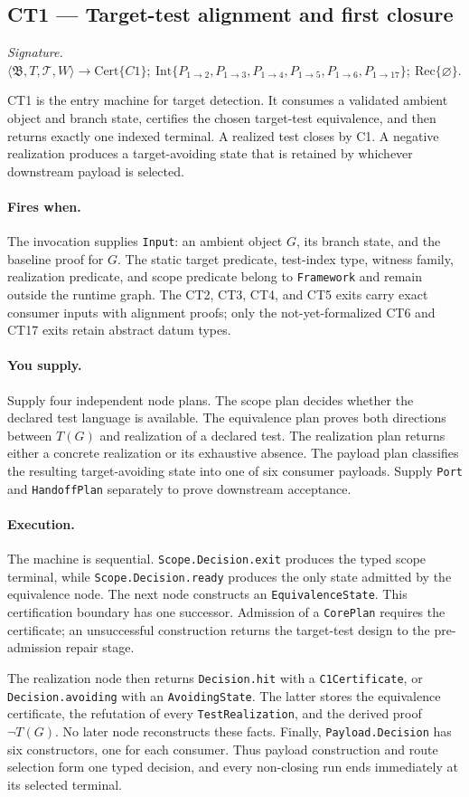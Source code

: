 \documentclass[
  11pt,
]{article}
\theoremstyle{definition}
\newcommand{\ctsignature}[1]{\par\noindent\emph{Signature.}\ #1\par\medskip}
\newcommand{\ctcert}[1]{\mathrm{Cert}\{#1\}}
\newcommand{\ctint}[1]{\mathrm{Int}\{#1\}}
\newcommand{\ctrec}[1]{\mathrm{Rec}\{#1\}}
\newcommand{\ctnone}{\varnothing}
\newcommand{\ctpar}[1]{\paragraph{#1.}}
\begin{document}
\subsection{CT1 --- Target-test alignment and first closure}\label{ct:1}\label{target-predicate-and-local-tests}
\ctsignature{\(\langle\mathfrak B,T,\mathcal T,W\rangle \to
\ctcert{C1};\allowbreak\ \ctint{P_{1\to2},\allowbreak P_{1\to3},\allowbreak P_{1\to4},\allowbreak P_{1\to5},\allowbreak P_{1\to6},\allowbreak P_{1\to17}};\allowbreak\ \ctrec{\ctnone}\).}

CT1 is the entry machine for target detection.  It consumes a validated
ambient object and branch state, certifies the chosen target-test
equivalence, and then returns exactly one indexed terminal.  A realized
test closes by C1.  A negative realization produces a target-avoiding state
that is retained by whichever downstream payload is selected.

\ctpar{Fires when}
The invocation supplies \texttt{Input}: an ambient object \(G\), its branch
state, and the baseline proof for \(G\).  The static target predicate,
test-index type, witness family, realization predicate, and scope predicate
belong to \texttt{Framework} and remain outside the runtime graph.  The CT2,
CT3, CT4, and CT5 exits carry exact consumer inputs with alignment proofs;
only the not-yet-formalized CT6 and CT17 exits retain abstract datum types.

\ctpar{You supply}
Supply four independent node plans.  The scope plan decides whether the
declared test language is available.  The equivalence plan proves both
directions between \(T(G)\) and realization of a declared test.  The
realization plan returns either a concrete realization or its exhaustive
absence.  The payload plan classifies the resulting target-avoiding state
into one of six consumer payloads.  Supply \texttt{Port} and
\texttt{HandoffPlan} separately to prove downstream acceptance.

\ctpar{Execution}
The machine is sequential.  \texttt{Scope.Decision.exit} produces the
typed scope terminal, while \texttt{Scope.Decision.ready} produces the
only state admitted by the equivalence node.  The next node constructs an
\texttt{EquivalenceState}.  This certification boundary has one successor.
Admission of a \texttt{CorePlan} requires the certificate; an unsuccessful
construction returns the target-test design to the pre-admission repair
stage.

The realization node then returns \texttt{Decision.hit} with a
\texttt{C1Certificate}, or \texttt{Decision.avoiding} with an
\texttt{AvoidingState}.  The latter stores the equivalence certificate,
the refutation of every \texttt{TestRealization}, and the derived proof
\(\neg T(G)\).  No later node reconstructs these facts.  Finally,
\texttt{Payload.Decision} has six constructors, one for each consumer.
Thus payload construction and route selection form one typed decision,
and every non-closing run ends immediately at its selected terminal.
\end{document}
